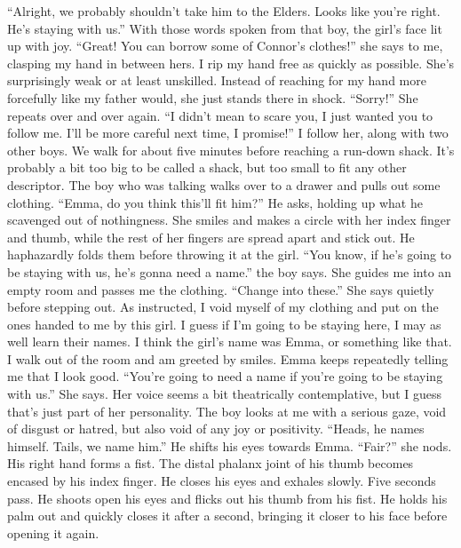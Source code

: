 \documentclass[openany, 12pt]{book}
\newcommand\tab[1][1cm]{\hspace*{#1}}
\begin{document}
``Alright, we probably shouldn’t take him to the Elders. Looks like you’re right. He’s staying with us.'' With those words spoken from that boy, the girl’s face lit up with joy.\newline
\tab
``Great! You can borrow some of Connor’s clothes!'' she says to me, clasping my hand in between hers. I rip my hand free as quickly as possible. She’s surprisingly weak or at least unskilled. Instead of reaching for my hand more forcefully like my father would, she just stands there in shock. ``Sorry!'' She repeats over and over again. ``I didn’t mean to scare you, I just wanted you to follow me. I’ll be more careful next time, I promise!''\newline
\tab
I follow her, along with two other boys. We walk for about five minutes before reaching a run-down shack. It’s probably a bit too big to be called a shack, but too small to fit any other descriptor. The boy who was talking walks over to a drawer and pulls out some clothing. ``Emma, do you think this’ll fit him?'' He asks, holding up what he scavenged out of nothingness. She smiles and makes a circle with her index finger and thumb, while the rest of her fingers are spread apart and stick out. He haphazardly folds them before throwing it at the girl. ``You know, if he’s going to be staying with us, he’s gonna need a name.'' the boy says.\newline
\tab
She guides me into an empty room and passes me the clothing. ``Change into these.'' She says quietly before stepping out. As instructed, I void myself of my clothing and put on the ones handed to me by this girl. I guess if I’m going to be staying here, I may as well learn their names. I think the girl’s name was Emma, or something like that.\newline
\tab
I walk out of the room and am greeted by smiles. Emma keeps repeatedly telling me that I look good. ``You’re going to need a name if you’re going to be staying with us.'' She says. Her voice seems a bit theatrically contemplative, but I guess that’s just part of her personality.\newline
\tab
The boy looks at me with a serious gaze, void of disgust or hatred, but also void of any joy or positivity. ``Heads, he names himself. Tails, we name him.'' He shifts his eyes towards Emma. ``Fair?'' she nods.\newline
\tab
His right hand forms a fist. The distal phalanx joint of his thumb becomes encased by his index finger. He closes his eyes and exhales slowly. Five seconds pass. He shoots open his eyes and flicks out his thumb from his fist. He holds his palm out and quickly closes it after a second, bringing it closer to his face before opening it again.\newline
\end{document}
